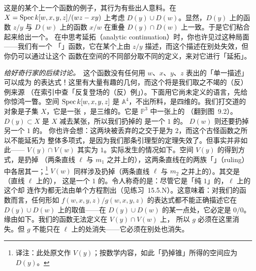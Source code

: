 \begin{example}[\extrahard]\label{thm:quadric-cone-section-example}
这是\trScheme{}的某个\trOpenSubset{}上一个函数的例子，其行为有些出人意料。在%
$X=\operatorname{Spec} k[w,x,y,z]/(wz-xy)$ 上考虑\trOpenSubset{} $D(y)\cup D(w)$。显然，$D(y)$ 上的函数 $z/y$ 与%
$D(w)$ 上的函数 $x/w$ 在重叠 $D(y)\cap D(w)$ 上一致。于是它们粘合起来给出一个\trSection。%
在\trComplexGeometry{}中思考\trAnalytic{}延拓（analytic continuation）时，你也许见过这种局面——我们有一个%
「\trHolomorphic{}」函数，它在某个\trOpenSet{}上由 $z/y$ 描述，而这个描述在别处失效，但你仍可以通过让这个%
函数在空间的不同部分取不同的定义，来对它进行「\trAnalytic{}延拓」。
\end{example}

\emph{给好奇行家的后续讨论。}\ 这个函数没有任何用 $w$、$x$、$y$、$z$ 表出的「单一描述」可以成为%
\trWellDefined{}的表达式！这里有大量有趣的几何，而这个\trScheme{}将是我们取之不竭的（反）例来源%
（在索引中查「反复登场的（反）例」）。下面用它尚未定义的语言，先给你惊鸿一瞥。空间%
$\operatorname{Spec} k[w,x,y,z]$ 是 $\mathbb{A}^4$，不出所料，是四维的。我们打交道的对象是子集 $X$，它是一张%
\trHypersurface，是三维的。它是 $\mathbb{P}^3$ 中一张\trSmooth\trQuadricSurface{}上的\trCone%
（翻到图~9.2）。\trOpenSubset{} $D(y)\subset X$ 是 $X$ 减去某张\trHypersurface，所以我们扔掉的%
是一个\trCodimension{} $1$ 的\trLocus。\trOpenSubset{} $D(w)$ 则还要扔掉另一个\trCodimension{} $1$ 的\trLocus。%
你也许会想：这两块被丢弃的\trLocus{}之交于是\trCodimension{}为 $2$，而这个古怪函数之所以不能延拓为%
整体多项式，是因为我们那条\trHartogs{}引理型的定理失效了。但事实并非如此——%
$V(y)\cap V(w)$ 其实\trCodimension{}为 $1$。实际发生的情况如下。空间 $V(y)$ 的得到方式，是扔掉%
（两条直线 $\ell$ 与 $m_1$ 之并上的）\trCone，这两条直线在\trSurface{}的两族「\trRuling{}」（ruling）中各居其一；\footnote{译注：此处原文作 $V(y)$；按数学内容，如此「扔掉锥」所得的空间应为 $D(y)$。}%
$V(w)$ 同样涉及扔掉（两条直线 $\ell$ 与 $m_2$ 之并上的）\trCone。其交是（直线 $\ell$ 上的）\trCone，%
这是一个\trCodimension{} $1$ 的\trSet。令人称奇的是：尽管它是「纯\trCodimension{} $1$」的，$\ell$ 上的这个\trCone{}却%
连作为\trSet{}都无法由单个方程割出（见练习~15.5.N）。这意味着：对我们的函数而言，任何形如%
$f(w,x,y,z)/g(w,x,y,z)$ 的表达式都不能正确描述它在 $D(y)\cup D(w)$ 上的取值——在%
$D(y)\cup D(w)$ 的某一点处，它必定是 $0/0$。缘由如下。我们的函数无法定义在 $V(y)\cap V(w)$ 上，%
所以 $g$ 必须在这里消失。但 $g$ 不能只在 $\ell$ 上的\trCone{}处消失——它必须在别处也消失。
